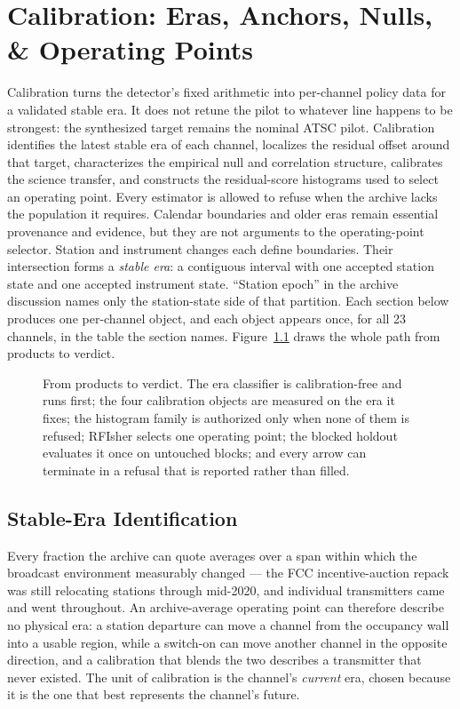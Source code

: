 \chapter{Calibration: Eras, Anchors, Nulls, \& Operating Points}
\label{sec:calibration}

Calibration turns the detector's fixed arithmetic into per-channel policy data
for a validated stable era.  It does not retune the pilot to whatever line happens to
be strongest: the synthesized target remains the nominal ATSC pilot.  Calibration
identifies the latest stable era of each channel, localizes the residual offset
around that target, characterizes the empirical null and correlation structure,
calibrates the science transfer, and constructs the residual-score histograms
used to select an operating point.  Every estimator is allowed to refuse when the
archive lacks the population it requires.  Calendar boundaries and older eras
remain essential provenance and evidence, but they are not arguments to the
operating-point selector.  Station and instrument changes each define
boundaries.  Their intersection forms a \emph{stable era}: a contiguous
interval with one accepted station state and one accepted instrument state.
``Station epoch'' in the archive discussion names only the station-state side
of that partition.  Each section below produces one per-channel object, and
each object appears once, for all 23 channels, in the table the section names.
Figure~\ref{fig:calibration:flow} draws the whole path from products to verdict.

\begin{figure}[t]
\centering
\resizebox{\linewidth}{!}{}
\caption[From products to verdict]{From products to verdict. The era classifier is calibration-free and runs first; the four calibration objects are measured on the era it fixes; the histogram family is authorized only when none of them is refused; RFIsher selects one operating point; the blocked holdout evaluates it once on untouched blocks; and every arrow can terminate in a refusal that is reported rather than filled.}
\label{fig:calibration:flow}
\end{figure}

\section{Stable-Era Identification}
\label{sec:calibration:eras}

Every fraction the archive can quote averages over a span within which the
broadcast environment measurably changed --- the FCC incentive-auction repack
was still relocating stations through mid-2020, and individual transmitters
came and went throughout.  An archive-average operating point can therefore
describe no physical era: a station departure can move a channel from the
occupancy wall into a usable region, while a switch-on can move another channel
in the opposite direction, and a calibration that blends the two describes a
transmitter that never existed.  The unit of calibration is the channel's
\emph{current} era, chosen because it is the one that best represents the
channel's future.

